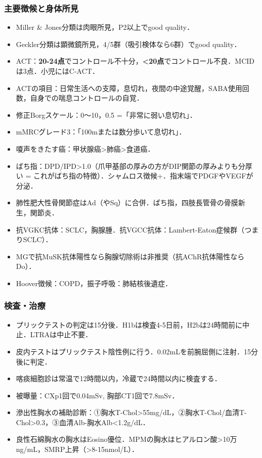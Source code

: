 \subsubsection{主要徴候と身体所見}
\begin{itemize}
\item Miller \& Jones分類は肉眼所見，P2以上でgood quality．

\item Geckler分類は顕微鏡所見，4/5群（吸引検体なら6群）でgood quality．

\item ACT：\textbf{20-24点}でコントロール不十分，\textbf{<20点}でコントロール不良．MCIDは3点．小児にはC-ACT．
\item ACTの項目：日常生活への支障，息切れ，夜間の中途覚醒，SABA使用回数，自身での喘息コントロールの自覚．
\item 修正Borgスケール：0〜10，0.5 =「非常に弱い息切れ」．
\item mMRCグレード3：「100mまたは数分歩いて息切れ」．

\item 嗄声をきたす癌：甲状腺癌>肺癌>食道癌．
\item ばち指：DPD/IPD>1.0（爪甲基部の厚みの方がDIP関節の厚みよりも分厚い = これがばち指の特徴）．シャムロス徴候+．指末端でPDGFやVEGFが分泌．
\item 肺性肥大性骨関節症はAd（やSq）に合併．ばち指，四肢長管骨の骨膜新生，関節炎．
\item 抗VGKC抗体：SCLC，胸腺腫．抗VGCC抗体：Lambert-Eaton症候群（つまりSCLC）．
\item MGで抗MuSK抗体陽性なら胸腺切除術は非推奨（抗AChR抗体陽性ならDo）．
\item Hoover徴候：COPD，振子呼吸：肺結核後遺症．

\end{itemize}
\subsubsection{検査・治療}

\begin{itemize}
\item プリックテストの判定は15分後．H1bは検査4-5日前，H2bは24時間前に中止．LTRAは中止不要．
\item 皮内テストはプリックテスト陰性例に行う．0.02mLを前腕屈側に注射．15分後に判定．

\item 喀痰細胞診は常温で12時間以内，冷蔵で24時間以内に検査する．
\item 被曝量：CXp1回で0.04mSv, 胸部CT1回で7.8mSv．

\item 滲出性胸水の補助診断：①胸水T-Chol>55mg/dL，②胸水T-Chol/血清T-Chol>0.3，③血清Alb-胸水Alb<1.2g/dL．
\item 良性石綿胸水の胸水はEosino優位．MPMの胸水はヒアルロン酸>10万ng/mL，SMRP上昇（>8-15nmol/L）．


\end{itemize}



